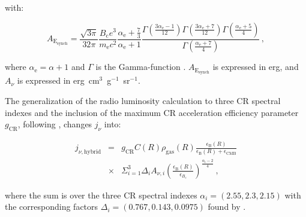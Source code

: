 \documentclass[traditabstract]{aa}
\newcommand{\rmn}{\mathrm}
\begin{document}
\begin{appendix}
with:

\begin{equation}
A_{\rmn{E_{synch}}} = \frac{\sqrt{3\pi}}{32\pi}\frac{B_{\rmn{c}}e^{3}}{m_{\rmn{e}}c^{2}}\frac{\alpha_{\rmn{e}}+\frac{7}{3}}{\alpha_{\rmn{e}}+1}\frac{\Gamma\left(\frac{3\alpha_{\rmn{e}}-1}{12}\right)\Gamma\left(\frac{3\alpha_{\rmn{e}}+7}{12}\right)\Gamma\left(\frac{\alpha_{\rmn{e}}+5}{4}\right)}{\Gamma\left(\frac{\alpha_{\rmn{e}}+7}{4}\right)} \, ,
\end{equation}

where $\alpha_{\rmn{e}}=\alpha+1$ and $\Gamma$ is the Gamma-function \citep{1965hmfw.book.....A}. $A_{\rmn{E_{synch}}}$ is expressed in erg, and $A_{\nu}$ is expressed in erg~cm$^{3}$~g$^{-1}$~sr$^{-1}$. 

The generalization of the radio luminosity calculation to three CR spectral indexes and the inclusion of the maximum CR acceleration efficiency parameter $g_{\rmn{CR}}$, following \cite{2010MNRAS.409..449P}, changes $j_{\nu}$ into:

\begin{eqnarray}
j_{\nu,\rmn{hybrid}} & = &g_{\rmn{CR}} C(R) \rho_{\rmn{gas}}(R) \frac{\epsilon_{\rmn{B}}(R)}{\epsilon_{\rmn{B}}(R)+\epsilon_{\rmn{CMB}}} \nonumber \\
& \times & \Sigma_{i=1}^{3} \Delta_{i} A_{\nu,i} \left( \frac{\epsilon_{\rmn{B}}(R)}{\epsilon_{B_{\rmn{c}}}} \right)^{\frac{\alpha_{i}-2}{4}}  \, ,
\end{eqnarray}

where the sum is over the three CR spectral indexes $\alpha_{i}=(2.55,2.3,2.15)$ with the corresponding factors $\Delta_{i} = (0.767, 0.143, 0.0975)$ found by \cite{2010MNRAS.409..449P}. 
 



\end{appendix}
\end{document}
